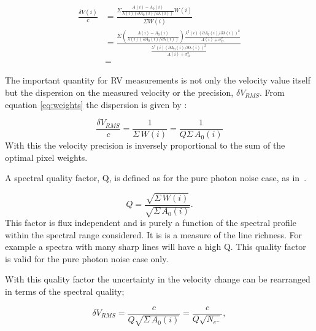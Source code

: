 \begin{eqnarray}
    \frac{\delta V(i)}{c} &= \frac{
    	\Sigma{
        	\frac{
            	A(i) - A_0(i)}{
                \lambda(i) \left(\partial A_0(i)/\partial \lambda(i)\right)} W(i)}}{
             \Sigma {W(i)}} \\
    &= \frac{
    	\Sigma  {
        	(\frac
            	{A(i) - A_0(i)}
                {\lambda(i) (\partial A_0(i)/\partial \lambda(i))}) \frac
                	{\lambda^2(i)  (\partial A_0(i)/\partial \lambda(i))^{2}}
                    {A(i) + {\sigma}^{2}_{D}}
                 } 
         }
    {\frac
    	{\lambda^2(i)  (\partial A_0(i)/\partial \lambda(i))^{2}}{A(i) + {\sigma}^{2}_{D}} 
        } \\
    &= 
    \label{eq:delta_v_eqarray}
\end{eqnarray}

The important quantity for RV measurements is not only the velocity value itself but the dispersion on the measured velocity or the precision, \(\delta V_{RMS}\). From equation \ref{eq:weights} the dispersion is given by :


\begin{equation}
    \frac{\delta V_{RMS}}{c} = \frac{1}{\Sigma {\,W(i)}} = \frac{1}{Q \Sigma {\,A_0(i)}}
\end{equation}
With this the velocity precision is  inversely proportional to the sum of the optimal pixel weights. 

A spectral quality factor, Q, is defined as  for the pure photon noise case, as in~\cite{Connes1985, connes_demonstration_1996}.

\begin{equation}
Q = \frac{\sqrt{\Sigma{\,W(i)}}}{\sqrt{\Sigma{\,A_0(i)}}}.
\end{equation}
This factor is flux independent and is purely a function of the spectral profile within the spectral range considered. It is is a measure of the line richness. For example a spectra with  many sharp lines will have a high Q. This quality factor is valid for the pure photon noise case only.

With this quality factor the uncertainty in the velocity change can be rearranged in terms of the spectral quality;

\begin{equation}
    \delta V_{RMS} = \frac{c}{Q \sqrt{\Sigma {\,A_0(i)}}} = \frac{c}{Q \sqrt{{N}_{{e}^{-}}}},
\end{equation}

